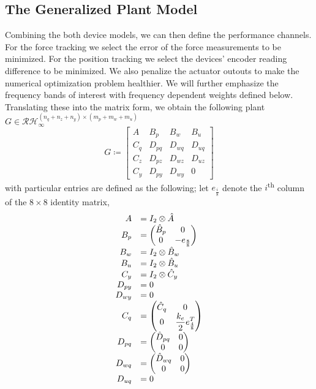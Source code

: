 \subsection{The Generalized Plant Model}
Combining the both device models, we can then define the performance channels. For the force tracking we select the error of 
the force measurements to be minimized. For the position tracking we select the devices' encoder reading difference to be 
minimized. We also penalize the actuator outouts to make the numerical optimization problem healthier. We will further emphasize 
the frequency bands of interest with frequency dependent weights defined below. Translating these into 
the matrix form, we obtain the following plant $G\in\mathcal{RH}_\infty^{(n_q+n_z+n_y)\times(m_p+m_w+m_u)}$
\begin{equation}
G \coloneqq \left[
\begin{array}{c|ccc}
	A    &B_p    &B_w    &B_u\\\hline
	C_q  &D_{pq} &D_{wq} &D_{uq}\\
	C_z  &D_{pz} &D_{wz} &D_{uz}\\
	C_y  &D_{py} &D_{wy} &0
\end{array}
\right]
\label{eq:app:genplantsymb}
\end{equation}
with particular entries are defined as the following; let $e_\frac{i}{8}$ denote the 
$i$\textsuperscript{th} column of the $8\times 8$ identity matrix,
\[
\begin{array}{rl}
A      &= I_2\otimes\hat{A}  \\
B_p    &= \pmatr{\hat{B}_p&0\\0&-e_{\frac{8}{8}}}\\
B_w    &= I_2\otimes\hat{B}_w\\
B_u    &= I_2\otimes\hat{B}_u\\
C_y    &= I_2\otimes\hat{C}_y\\
D_{py} &= 0\\%
D_{wy} &= 0\\%
C_q    &=\pmatr{\hat{C}_q &0\\0&\displaystyle\frac{k_e}{2}e^T_\frac{4}{8}}\\
D_{pq} &= \pmatr{\hat{D}_{pq} &0\\0&0}\\
D_{wq} &= \pmatr{\hat{D}_{wq} &0\\0&0}\\
D_{uq} &= 0\\%
\end{array}
\]
